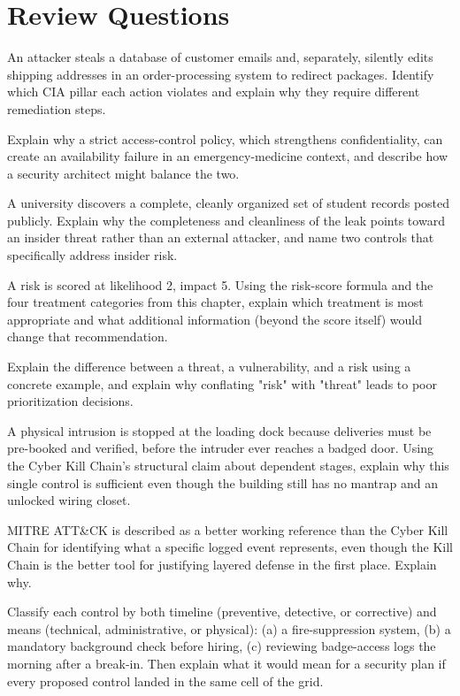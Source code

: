 \section*{Review Questions}
\begin{reviewquestions}
\item An attacker steals a database of customer emails and, separately, silently edits shipping
addresses in an order-processing system to redirect packages. Identify which CIA pillar each
action violates and explain why they require different remediation steps.
\item Explain why a strict access-control policy, which strengthens confidentiality, can create an
availability failure in an emergency-medicine context, and describe how a security architect might
balance the two.
\item A university discovers a complete, cleanly organized set of student records posted publicly.
Explain why the completeness and cleanliness of the leak points toward an insider threat rather
than an external attacker, and name two controls that specifically address insider risk.
\item A risk is scored at likelihood 2, impact 5. Using the risk-score formula and the four
treatment categories from this chapter, explain which treatment is most appropriate and what
additional information (beyond the score itself) would change that recommendation.
\item Explain the difference between a threat, a vulnerability, and a risk using a concrete
example, and explain why conflating "risk" with "threat" leads to poor prioritization decisions.
\item A physical intrusion is stopped at the loading dock because deliveries must be pre-booked
and verified, before the intruder ever reaches a badged door. Using the Cyber Kill Chain's
structural claim about dependent stages, explain why this single control is sufficient even
though the building still has no mantrap and an unlocked wiring closet.
\item MITRE ATT\&CK is described as a better working reference than the Cyber Kill Chain for
identifying what a specific logged event represents, even though the Kill Chain is the better tool
for justifying layered defense in the first place. Explain why.
\item Classify each control by both timeline (preventive, detective, or corrective) and means
(technical, administrative, or physical): (a) a fire-suppression system, (b) a mandatory
background check before hiring, (c) reviewing badge-access logs the morning after a break-in.
Then explain what it would mean for a security plan if every proposed control landed in the same
cell of the grid.
\end{reviewquestions}

